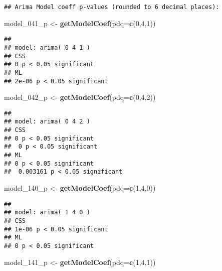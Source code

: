 \documentclass[]{article}
\newenvironment{Shaded}{\begin{snugshade}}{\end{snugshade}}
\newcommand{\DataTypeTok}[1]{\textcolor[rgb]{0.13,0.29,0.53}{#1}}
\newcommand{\DecValTok}[1]{\textcolor[rgb]{0.00,0.00,0.81}{#1}}
\newcommand{\KeywordTok}[1]{\textcolor[rgb]{0.13,0.29,0.53}{\textbf{#1}}}
\newcommand{\NormalTok}[1]{#1}
\newcommand{\StringTok}[1]{\textcolor[rgb]{0.31,0.60,0.02}{#1}}
\begin{document}
\begin{verbatim}
## Arima Model coeff p-values (rounded to 6 decimal places):
\end{verbatim}

\begin{Shaded}
\begin{Highlighting}[]
\NormalTok{model_}\DecValTok{041}\NormalTok{_p <-}\StringTok{ }\KeywordTok{getModelCoef}\NormalTok{(}\DataTypeTok{pdq=}\KeywordTok{c}\NormalTok{(}\DecValTok{0}\NormalTok{,}\DecValTok{4}\NormalTok{,}\DecValTok{1}\NormalTok{))}
\end{Highlighting}
\end{Shaded}

\begin{verbatim}
## 
## model: arima( 0 4 1 )
## CSS 
## 0 p < 0.05 significant 
## ML 
## 2e-06 p < 0.05 significant
\end{verbatim}

\begin{Shaded}
\begin{Highlighting}[]
\NormalTok{model_}\DecValTok{042}\NormalTok{_p <-}\StringTok{ }\KeywordTok{getModelCoef}\NormalTok{(}\DataTypeTok{pdq=}\KeywordTok{c}\NormalTok{(}\DecValTok{0}\NormalTok{,}\DecValTok{4}\NormalTok{,}\DecValTok{2}\NormalTok{))}
\end{Highlighting}
\end{Shaded}

\begin{verbatim}
## 
## model: arima( 0 4 2 )
## CSS 
## 0 p < 0.05 significant 
##  0 p < 0.05 significant 
## ML 
## 0 p < 0.05 significant 
##  0.003161 p < 0.05 significant
\end{verbatim}

\begin{Shaded}
\begin{Highlighting}[]
\NormalTok{model_}\DecValTok{140}\NormalTok{_p <-}\StringTok{ }\KeywordTok{getModelCoef}\NormalTok{(}\DataTypeTok{pdq=}\KeywordTok{c}\NormalTok{(}\DecValTok{1}\NormalTok{,}\DecValTok{4}\NormalTok{,}\DecValTok{0}\NormalTok{))}
\end{Highlighting}
\end{Shaded}

\begin{verbatim}
## 
## model: arima( 1 4 0 )
## CSS 
## 1e-06 p < 0.05 significant 
## ML 
## 0 p < 0.05 significant
\end{verbatim}

\begin{Shaded}
\begin{Highlighting}[]
\NormalTok{model_}\DecValTok{141}\NormalTok{_p <-}\StringTok{ }\KeywordTok{getModelCoef}\NormalTok{(}\DataTypeTok{pdq=}\KeywordTok{c}\NormalTok{(}\DecValTok{1}\NormalTok{,}\DecValTok{4}\NormalTok{,}\DecValTok{1}\NormalTok{))}
\end{Highlighting}
\end{Shaded}
\end{document}
